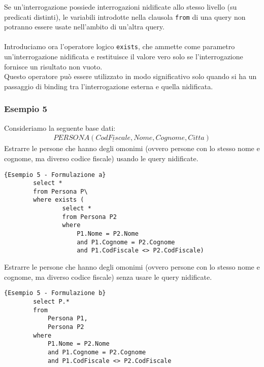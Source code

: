 Se un'interrogazione possiede interrogazioni nidificate allo stesso livello (su predicati distinti), le variabili introdotte nella clausola \texttt{from} di una query non potranno essere usate nell'ambito di un'altra query.\\\\
Introduciamo ora l'operatore logico \texttt{exists}, che ammette come parametro un'interrogazione nidificata e restituisce il valore vero solo se l'interrogazione fornisce un risultato non vuoto.\\
Questo operatore può essere utilizzato in modo significativo solo quando si ha un passaggio di binding tra l'interrogazione esterna e quella nidificata.

\subsubsection{Esempio 5}
Consideriamo la seguente base dati:
	\begin{equation}\begin{aligned}
		PERSONA (\underline{CodFiscale}, Nome, Cognome, Citta)
	\end{aligned}\end{equation}
Estrarre le persone che hanno degli omonimi (ovvero persone con lo stesso nome e cognome, ma diverso codice fiscale) usando le query nidificate.
	\begin{lstlisting}{Esempio 5 - Formulazione a}
		select *
		from Persona P\
		where exists (
				select *
				from Persona P2
				where 
					P1.Nome = P2.Nome
					and P1.Cognome = P2.Cognome
					and P1.CodFiscale <> P2.CodFiscale)
	\end{lstlisting}
Estrarre le persone che hanno degli omonimi (ovvero persone con lo stesso nome e cognome, ma diverso codice fiscale) senza usare le query nidificate.
	\begin{lstlisting}{Esempio 5 - Formulazione b}
		select P.*
		from
			Persona P1,
			Persona P2
		where
			P1.Nome = P2.Nome
			and P1.Cognome = P2.Cognome
			and P1.CodFiscale <> P2.CodFiscale
	\end{lstlisting}

